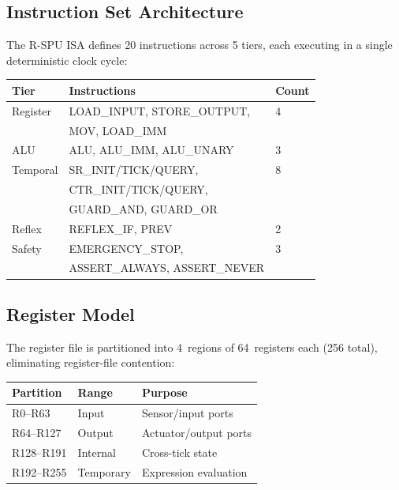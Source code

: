 \documentclass[conference]{IEEEtran}
\begin{document}
\subsection{Instruction Set Architecture}

The R-SPU ISA defines 20 instructions across 5 tiers, each executing in
a single deterministic clock cycle:

\begin{center}
\footnotesize
\begin{tabular}{@{}lll@{}}
\toprule
\textbf{Tier} & \textbf{Instructions} & \textbf{Count} \\
\midrule
Register  & LOAD\_INPUT, STORE\_OUTPUT, & 4 \\
          & MOV, LOAD\_IMM & \\
ALU       & ALU, ALU\_IMM, ALU\_UNARY & 3 \\
Temporal  & SR\_INIT/TICK/QUERY, & 8 \\
          & CTR\_INIT/TICK/QUERY, & \\
          & GUARD\_AND, GUARD\_OR & \\
Reflex    & REFLEX\_IF, PREV & 2 \\
Safety    & EMERGENCY\_STOP, & 3 \\
          & ASSERT\_ALWAYS, ASSERT\_NEVER & \\
\bottomrule
\end{tabular}
\end{center}

\subsection{Register Model}

The register file is partitioned into 4~regions of 64~registers each
(256 total), eliminating register-file contention:

\begin{center}
\footnotesize
\begin{tabular}{@{}lll@{}}
\toprule
\textbf{Partition} & \textbf{Range} & \textbf{Purpose} \\
\midrule
R0--R63    & Input  & Sensor/input ports \\
R64--R127  & Output & Actuator/output ports \\
R128--R191 & Internal & Cross-tick state \\
R192--R255 & Temporary & Expression evaluation \\
\bottomrule
\end{tabular}
\end{center}
\end{document}
